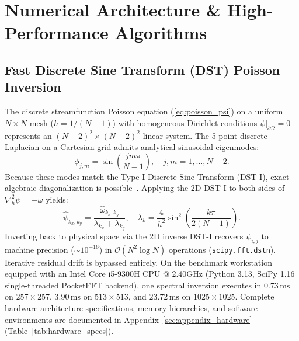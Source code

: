 \documentclass[11pt,a4paper]{article}
\begin{document}
\section{Numerical Architecture \& High-Performance Algorithms}

\subsection{Fast Discrete Sine Transform (DST) Poisson Inversion}
The discrete streamfunction Poisson equation (\ref{eq:poisson_psi}) on a uniform $N \times N$ mesh ($h = 1/(N-1)$) with homogeneous Dirichlet conditions $\psi|_{\partial \Omega} = 0$ represents an $(N-2)^2 \times (N-2)^2$ linear system. The 5-point discrete Laplacian on a Cartesian grid admits analytical sinusoidal eigenmodes:
\begin{equation}
    \phi_{j, m} = \sin\left(\frac{j m \pi}{N-1}\right), \quad j, m = 1, \dots, N-2.
\end{equation}
Because these modes match the Type-I Discrete Sine Transform (DST-I), exact algebraic diagonalization is possible~\cite{swarztrauber1977methods}. Applying the 2D DST-I to both sides of $\nabla_h^2 \psi = -\omega$ yields:
\begin{equation}
    \hat{\psi}_{k_x, k_y} = \frac{\hat{\omega}_{k_x, k_y}}{\lambda_{k_x} + \lambda_{k_y}}, \quad \lambda_k = \frac{4}{h^2} \sin^2\left(\frac{k \pi}{2(N-1)}\right).
\end{equation}
Inverting back to physical space via the 2D inverse DST-I recovers $\psi_{i, j}$ to machine precision ($\sim 10^{-16}$) in $\mathcal{O}(N^2 \log N)$ operations (\texttt{scipy.fft.dstn}). Iterative residual drift is bypassed entirely. On the benchmark workstation equipped with an Intel Core i5-9300H CPU @ 2.40GHz (Python 3.13, SciPy 1.16 single-threaded PocketFFT backend), one spectral inversion executes in $0.73\,\text{ms}$ on $257 \times 257$, $3.90\,\text{ms}$ on $513 \times 513$, and $23.72\,\text{ms}$ on $1025 \times 1025$. Complete hardware architecture specifications, memory hierarchies, and software environments are documented in Appendix~\ref{sec:appendix_hardware} (Table~\ref{tab:hardware_specs}).
\end{document}
